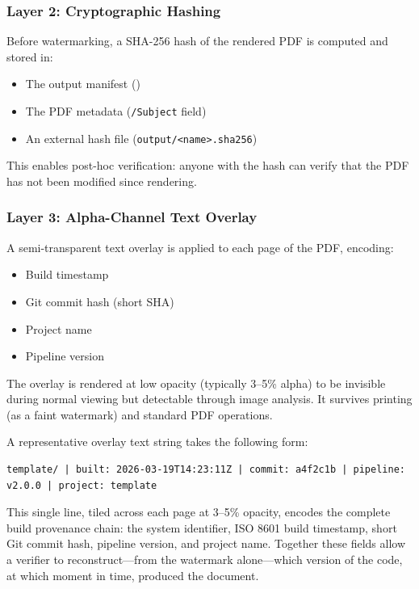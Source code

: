 \documentclass[
]{article}
\providecommand{\tightlist}{%
  \setlength{\itemsep}{0pt}\setlength{\parskip}{0pt}}
\begin{document}
\subsubsection{Layer 2: Cryptographic
Hashing}\label{layer-2-cryptographic-hashing}

Before watermarking, a SHA-256 hash of the rendered PDF is computed and
stored in:

\begin{itemize}
\tightlist
\item
  The output manifest ()
\item
  The PDF metadata (\texttt{/Subject} field)
\item
  An external hash file
  (\texttt{output/\textless{}name\textgreater{}.sha256})
\end{itemize}

This enables post-hoc verification: anyone with the hash can verify that
the PDF has not been modified since rendering.

\subsubsection{Layer 3: Alpha-Channel Text
Overlay}\label{layer-3-alpha-channel-text-overlay}

A semi-transparent text overlay is applied to each page of the PDF,
encoding:

\begin{itemize}
\tightlist
\item
  Build timestamp
\item
  Git commit hash (short SHA)
\item
  Project name
\item
  Pipeline version
\end{itemize}

The overlay is rendered at low opacity (typically 3--5\% alpha) to be
invisible during normal viewing but detectable through image analysis.
It survives printing (as a faint watermark) and standard PDF operations.

A representative overlay text string takes the following form:

\begin{verbatim}
template/ | built: 2026-03-19T14:23:11Z | commit: a4f2c1b | pipeline: v2.0.0 | project: template
\end{verbatim}

This single line, tiled across each page at 3--5\% opacity, encodes the
complete build provenance chain: the system identifier, ISO 8601 build
timestamp, short Git commit hash, pipeline version, and project name.
Together these fields allow a verifier to reconstruct---from the
watermark alone---which version of the code, at which moment in time,
produced the document.
\end{document}
